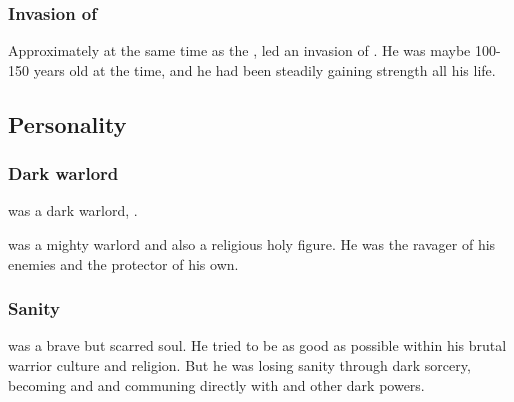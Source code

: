 \subsubsection{Invasion of \Velcad}
Approximately at the same time as the , \Narkiza led an invasion of \Velcad.
He was maybe 100-150 years old at the time, and he had been steadily gaining strength all his life. 








\subsection{Personality}





\subsubsection{Dark warlord}
\Narkiza was a dark warlord, . 

\Narkiza was a mighty warlord and also a religious holy figure.
He was the ravager of his enemies and the protector of his own.







\subsubsection{Sanity}
\Narkiza was a brave but scarred soul.
He tried to be as good as possible within his brutal warrior culture and religion. 
But he was losing sanity through dark sorcery, becoming and \Ashenoch and communing directly with \Nechsain and other dark powers. 





